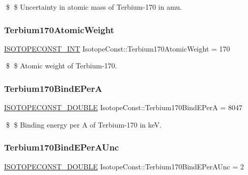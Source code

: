 \$ \$ Uncertainty in atomic mass of Terbium-\/170 in amu. \mbox{\label{group___isotope_const-_terbium-_tb170_ga8bfcb5c776fce1787fa6aab8d7a8e0fe}} 
\subsubsection{\texorpdfstring{Terbium170\+Atomic\+Weight}{Terbium170AtomicWeight}}
{\footnotesize\ttfamily \mbox{\hyperlink{group___isotope_const-_macros_ga5f18360b3e99483a35c32d789e62621c}{I\+S\+O\+T\+O\+P\+E\+C\+O\+N\+S\+T\+\_\+\+I\+NT}} Isotope\+Const\+::\+Terbium170\+Atomic\+Weight = 170}

\$ \$ Atomic weight of Terbium-\/170. \mbox{\label{group___isotope_const-_terbium-_tb170_ga739fb79e872b78fd2694454d3f1cc518}} 
\subsubsection{\texorpdfstring{Terbium170\+Bind\+E\+PerA}{Terbium170BindEPerA}}
{\footnotesize\ttfamily \mbox{\hyperlink{group___isotope_const-_macros_ga8f45a7272ce02c0b4c65c44636ed719a}{I\+S\+O\+T\+O\+P\+E\+C\+O\+N\+S\+T\+\_\+\+D\+O\+U\+B\+LE}} Isotope\+Const\+::\+Terbium170\+Bind\+E\+PerA = 8047}

\$ \$ Binding energy per A of Terbium-\/170 in keV. \mbox{\label{group___isotope_const-_terbium-_tb170_ga3deb63fd50cadce0e39ef64365b41a3e}} 
\subsubsection{\texorpdfstring{Terbium170\+Bind\+E\+Per\+A\+Unc}{Terbium170BindEPerAUnc}}
{\footnotesize\ttfamily \mbox{\hyperlink{group___isotope_const-_macros_ga8f45a7272ce02c0b4c65c44636ed719a}{I\+S\+O\+T\+O\+P\+E\+C\+O\+N\+S\+T\+\_\+\+D\+O\+U\+B\+LE}} Isotope\+Const\+::\+Terbium170\+Bind\+E\+Per\+A\+Unc = 2}

